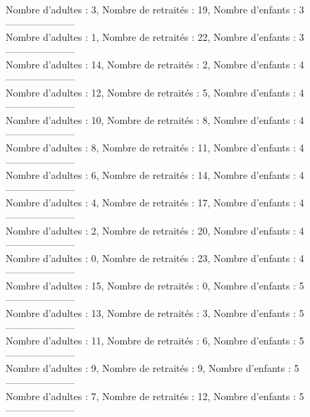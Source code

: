 \documentclass[10pt,a4paper]{article}
\begin{document}
Nombre d'adultes : 3, Nombre de retraités : 19, Nombre d'enfants : 3\\
---------------------\\
Nombre d'adultes : 1, Nombre de retraités : 22, Nombre d'enfants : 3\\
---------------------\\
Nombre d'adultes : 14, Nombre de retraités : 2, Nombre d'enfants : 4\\
---------------------\\
Nombre d'adultes : 12, Nombre de retraités : 5, Nombre d'enfants : 4\\
---------------------\\
Nombre d'adultes : 10, Nombre de retraités : 8, Nombre d'enfants : 4\\
---------------------\\
Nombre d'adultes : 8, Nombre de retraités : 11, Nombre d'enfants : 4\\
---------------------\\
Nombre d'adultes : 6, Nombre de retraités : 14, Nombre d'enfants : 4\\
---------------------\\
Nombre d'adultes : 4, Nombre de retraités : 17, Nombre d'enfants : 4\\
---------------------\\
Nombre d'adultes : 2, Nombre de retraités : 20, Nombre d'enfants : 4\\
---------------------\\
Nombre d'adultes : 0, Nombre de retraités : 23, Nombre d'enfants : 4\\
---------------------\\
Nombre d'adultes : 15, Nombre de retraités : 0, Nombre d'enfants : 5\\
---------------------\\
Nombre d'adultes : 13, Nombre de retraités : 3, Nombre d'enfants : 5\\
---------------------\\
Nombre d'adultes : 11, Nombre de retraités : 6, Nombre d'enfants : 5\\
---------------------\\
Nombre d'adultes : 9, Nombre de retraités : 9, Nombre d'enfants : 5\\
---------------------\\
Nombre d'adultes : 7, Nombre de retraités : 12, Nombre d'enfants : 5\\
---------------------\\
\end{document}
